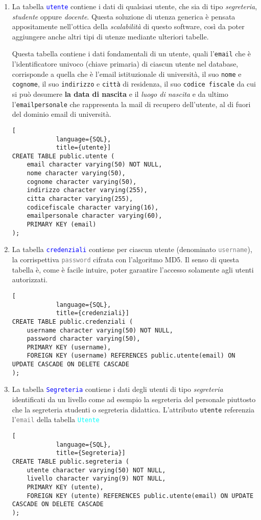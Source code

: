 \documentclass{article}
\newcommand{\tabb}[1]{\texttt{\textcolor{blue}{#1}}}
\newcommand{\tab}[1]{\texttt{\textcolor{cyan}{#1}}}
\newcommand{\attr}[1]{\texttt{\textcolor{gray}{#1}}}
\begin{document}
    \begin{enumerate}
        \item La tabella \tabb{utente} contiene i dati di qualsiasi utente, che sia di tipo \emph{segreteria}, \emph{studente} oppure \emph{docente}. Questa soluzione di utenza generica è pensata appositamente nell'ottica della \emph{scalabilità} di questo software, così da poter aggiungere anche altri tipi di utenze mediante ulteriori tabelle.

        Questa tabella contiene i dati fondamentali di un utente, quali l'\texttt{email} che è l'identificatore univoco (chiave primaria) di ciascun utente nel database, corrisponde a quella che è l'email istituzionale di università, il suo \texttt{nome} e \texttt{cognome}, il suo \texttt{indirizzo} e \texttt{città} di residenza, il suo \texttt{codice fiscale} da cui si può desumere \textbf{la data di nascita} e il \textit{luogo di nascita} e da ultimo l'\texttt{emailpersonale} che rappresenta la mail di recupero dell'utente, al di fuori del dominio email di università.
        \begin{lstlisting}[
            language={SQL},
            title={utente}]
CREATE TABLE public.utente (
    email character varying(50) NOT NULL,
    nome character varying(50),
    cognome character varying(50),
    indirizzo character varying(255),
    citta character varying(255),
    codicefiscale character varying(16),
    emailpersonale character varying(60),
    PRIMARY KEY (email)
);
        \end{lstlisting}

        \item La tabella \tabb{credenziali} contiene per ciascun utente (denominato \attr{username}), la corrispettiva \attr{password} cifrata con l'algoritmo MD5. Il senso di questa tabella è, come è facile intuire, poter garantire l'accesso solamente agli utenti autorizzati.
        \begin{lstlisting}[
            language={SQL},
            title={credenziali}]
CREATE TABLE public.credenziali (
    username character varying(50) NOT NULL,
    password character varying(50),
    PRIMARY KEY (username),
    FOREIGN KEY (username) REFERENCES public.utente(email) ON UPDATE CASCADE ON DELETE CASCADE
);
        \end{lstlisting}

        \pagebreak

        \item La tabella \tabb{Segreteria} contiene i dati degli utenti di tipo \textit{segreteria} identificati da un livello come ad esempio la segreteria del personale piuttosto che la segreteria studenti o segreteria didattica. L'attributo \texttt{utente} referenzia l'\attr{email} della tabella \tab{Utente}
        \begin{lstlisting}[
            language={SQL},
            title={Segreteria}]
CREATE TABLE public.segreteria (
    utente character varying(50) NOT NULL,
    livello character varying(9) NOT NULL,
    PRIMARY KEY (utente),
    FOREIGN KEY (utente) REFERENCES public.utente(email) ON UPDATE CASCADE ON DELETE CASCADE
);
        \end{lstlisting}


\end{enumerate}
\end{document}
